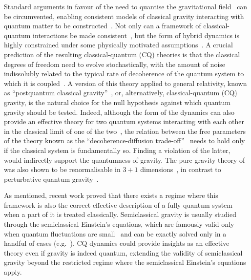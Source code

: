 \documentclass[amsmath,amssymb,11pt]{article}
\begin{document}
Standard arguments in favour of the need to quantise the gravitational field~\cite{eppley1977tnecessity,bergmann1957summary} can be circumvented, enabling consistent models of classical gravity interacting with quantum matter to be constructed~\cite{diosi1995quantum,alicki2003completely,kafri2014classical,tilloy2016sourcing,tilloy2017principle}. Not only can a framework of classical-quantum interactions be made consistent~\cite{blanchard1995event-enhanced,diosi2014hybrid}, but the form of hybrid dynamics is highly constrained under some physically motivated assumptions~\cite{oppenheim2021postquantum,oppenheim2022classes}. A crucial prediction of the resulting classical-quantum (CQ) theories is that the classical degrees of freedom need to evolve stochastically, with the amount of noise indissolubly related to the typical rate of decoherence of the quantum system to which it is coupled~\cite{diosi1995quantum,oppenheim2021postquantum,oppenheim2023gravitationally}. A version of this theory applied to general relativity, known as ``postquantum classical gravity''~\cite{oppenheim2022classes,oppenheim2023path,oppenheim2023covariant,oppenheim2024diffeomorphism,oppenheim2022constraints,layton2023weak}, or, alternatively, classical-quantum (CQ) gravity, is the natural choice for the null hypothesis against which quantum gravity should be tested. Indeed, although the form of the dynamics can also provide an effective theory for two quantum systems interacting with each other in the classical limit of one of the two~\cite{layton2024classical}, the relation between the free parameters of the theory known as the “decoherence-diffusion trade-off”~\cite{oppenheim2023gravitationally} needs to hold only if the classical system is fundamentally so. Finding a violation of the latter, would indirectly support the quantumness of gravity. The pure gravity theory of~\cite{oppenheim2023covariant} was also shown to be renormalisable in $3+1$ dimensions~\cite{grudka2024renormalisation}, in contrast to perturbative quantum gravity~\cite{goroff1985ultraviolet}. 

As mentioned, recent work proved that there exists a regime where this framework is also the correct effective description of a fully quantum system when a part of it is treated classically. Semiclassical gravity is usually studied through the semiclassical Einstein's equations, which are famously valid only when quantum fluctuations are small~\cite{kuo1993semiclassical,ahmed2024semiclassical} and can be exactly solved only in a handful of cases (e.g.~\cite{christensen1977trace,emparan2002quantum,emparan2020quantum,emparan2022black,panella2023quantum,climent2024chemical,panella2024three-dimensional}). CQ dynamics could provide insights as an effective theory even if gravity is indeed quantum, extending the validity of semiclassical gravity beyond the restricted regime where the semiclassical Einstein's equations apply. 
\end{document}

